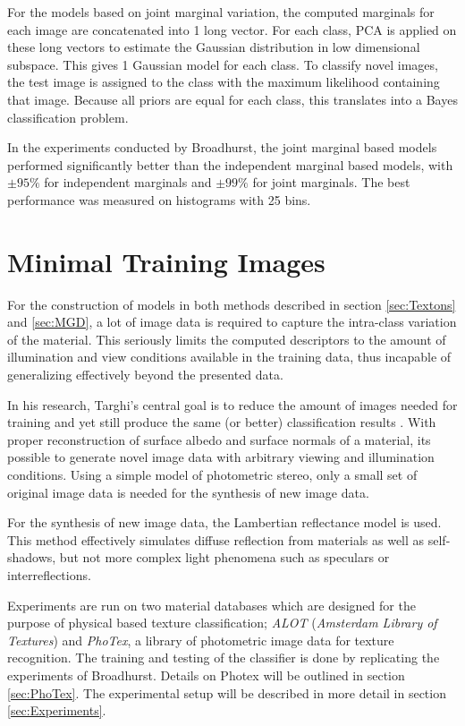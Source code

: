 For the models based on joint marginal variation, the computed marginals for each image are concatenated into 1 long vector. For each class, PCA is applied on these long vectors to estimate the Gaussian distribution in low dimensional subspace. This gives 1 Gaussian model for each class. To classify novel images, the test image is assigned to the class with the maximum likelihood containing that image. Because all priors are equal for each class, this translates into a Bayes classification problem.

In the experiments conducted by Broadhurst, the joint marginal based models performed significantly better than the independent marginal based models, with $\pm 95\%$ for independent marginals and $\pm 99\%$ for joint marginals. The best performance was measured on histograms with 25 bins. 

\section{Minimal Training Images}\label{sec:Minimal}

For the construction of models in both methods described in section \ref{sec:Textons} and \ref{sec:MGD}, a lot of image data is required to capture the intra-class variation of the material. This seriously limits the computed descriptors to the amount of illumination and view conditions available in the training data, thus incapable of generalizing effectively beyond the presented data.

In his research, Targhi's central goal is to reduce the amount of images needed for training and yet still produce the same (or better) classification results \cite{Targhi}. With proper reconstruction of surface albedo and surface normals of a material, its possible to generate novel image data with arbitrary viewing and illumination conditions. Using a simple model of photometric stereo, only a small set of original image data is needed for the synthesis of new image data.

For the synthesis of new image data, the Lambertian reflectance model is used. This method effectively simulates diffuse reflection from materials as well as self-shadows, but not more complex light phenomena such as speculars or interreflections. 

Experiments are run on two material databases which are designed for the purpose of physical based texture classification; \textit{ALOT} (\textit{Amsterdam Library of Textures}) and \textit{PhoTex}, a library of photometric image data for texture recognition. The training and testing of the classifier is done by replicating the experiments of Broadhurst. Details on Photex will be outlined in section \ref{sec:PhoTex}. The experimental setup will be described in more detail in section \ref{sec:Experiments}.

